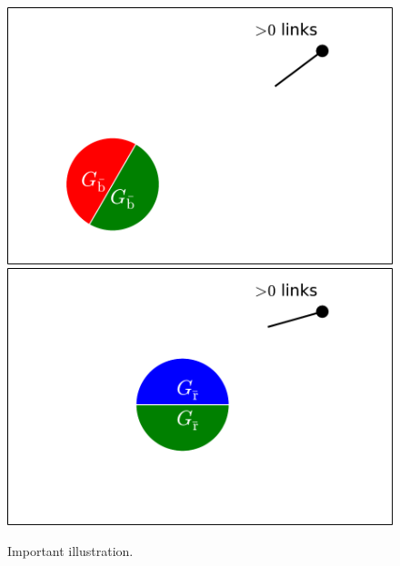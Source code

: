\documentclass[aps, pre, onecolumn, a4paper, floatfix]{revtex4}
\begin{document}
\begin{figure}[htb]
\begin{minipage}[b]{0.35\linewidth}
\begin{center}
     \vspace{-1mm}
    \includegraphics[clip,width=0.99\columnwidth]{sets_k_gc_no_3.pdf}\\
     \vspace{-1mm}
    \includegraphics[width=0.99\columnwidth]{sets_k_gc_no_1.pdf}
   \end{center}
  \end{minipage}
    \caption{Important illustration.}
    \label{fig:1}
\end{figure}
\end{document}
